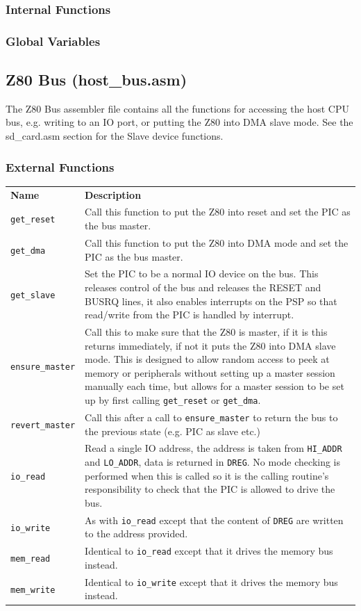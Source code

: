 \documentclass[a4paper,10pt]{book}
\begin{document}
\subsubsection{Internal Functions}

\subsubsection{Global Variables}

\subsection{Z80 Bus (host\_bus.asm)}
The Z80 Bus assembler file contains all the functions for accessing the host CPU bus, e.g. writing to an IO port, or putting the Z80 into DMA slave mode.  See the sd\_card.asm section for the Slave device functions.

\subsubsection{External Functions}
\begin{tabular}{lp{8cm}}
 \textbf{Name}&\textbf{Description}\\
 \texttt{get\_reset}&Call this function to put the Z80 into reset and set the PIC as the bus master.\\
 \texttt{get\_dma}&Call this function to put the Z80 into DMA mode and set the PIC as the bus master.\\
 \texttt{get\_slave}&Set the PIC to be a normal IO device on the bus.  This releases control of the bus and releases the RESET and BUSRQ lines, it also enables interrupts on the PSP so that read/write from the PIC is handled by interrupt.\\
 \texttt{ensure\_master}&Call this to make sure that the Z80 is master, if it is this returns immediately, if not it puts the Z80 into DMA slave mode.  This is designed to allow random access to peek at memory or peripherals without setting up a master session manually each time, but allows for a master session to be set up by first calling \texttt{get\_reset} or \texttt{get\_dma}.\\
 \texttt{revert\_master}&Call this after a call to \texttt{ensure\_master} to return the bus to the previous state (e.g. PIC as slave etc.)\\
 \texttt{io\_read}&Read a single IO address, the address is taken from \texttt{HI\_ADDR} and \texttt{LO\_ADDR}, data is returned in \texttt{DREG}.  No mode checking is performed when this is called so it is the calling routine's responsibility to check that the PIC is allowed to drive the bus.\\
 \texttt{io\_write}&As with \texttt{io\_read} except that the content of \texttt{DREG} are written to the address provided.\\
 \texttt{mem\_read}&Identical to \texttt{io\_read} except that it drives the memory bus instead.\\
 \texttt{mem\_write}&Identical to \texttt{io\_write} except that it drives the memory bus instead.\\
\end{tabular}
\end{document}
